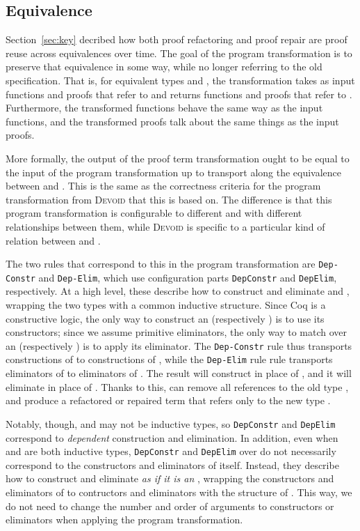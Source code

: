 \subsection{Equivalence}
\label{sec:equivalence}

Section~\ref{sec:key} decribed how both proof refactoring and proof repair are proof reuse across
equivalences over time.
The goal of the program transformation is to preserve that equivalence in some way, while no longer referring to the old specification.
That is, for equivalent types \A and \B, the transformation takes as input functions and proofs
that refer to \A and returns functions and proofs that refer to \B.
Furthermore, the transformed functions behave the same way as the input functions,
and the transformed proofs talk about the same things as the input proofs.

More formally, the output of the proof term transformation ought to be equal to the input of the program transformation
up to transport along the equivalence between \A and \B.
This is the same as the correctness criteria for the program transformation from \textsc{Devoid} that this is based on.
The difference is that this program transformation is configurable to different \A and \B with different relationships between them,
while \textsc{Devoid} is specific to a particular kind of relation between \A and \B.

The two rules that correspond to this in the program transformation are \lstinline{Dep-Constr} and \lstinline{Dep-Elim},
which use configuration parts \lstinline{DepConstr} and \lstinline{DepElim}, respectively.
At a high level, these describe how to construct and eliminate \A and \B, wrapping the two types with a common inductive structure.
Since Coq is a constructive logic, the only way to construct an \A (respectively \B) is to use its
constructors; since we assume primitive eliminators, the only way to match over an \A (respectively \B)
is to apply its eliminator. 
The \lstinline{Dep-Constr} rule thus transports constructions of \A to constructions of \B,
while the \lstinline{Dep-Elim} rule rule transports eliminators of \A to eliminators of \B.
The result will construct \B in place of \A, and it will eliminate \B in place of \A.
Thanks to this, \toolname can remove all references to the old type \A,
and produce a refactored or repaired term that refers only to the new type \B.

Notably, though, \A and \B may not be inductive types, so \lstinline{DepConstr} and \lstinline{DepElim}
correspond to \textit{dependent} construction and elimination.
In addition, even when \A and \B are both inductive types,
\lstinline{DepConstr} and \lstinline{DepElim} over \B do not necessarily correspond
to the constructors and eliminators of \B itself.
Instead, they describe how to construct and eliminate \B \textit{as if it is an \A},
wrapping the constructors and eliminators of \B to contructors and eliminators with the
structure of \A.
This way, we do not need to change the number and order of arguments to constructors or eliminators when applying the program transformation.

